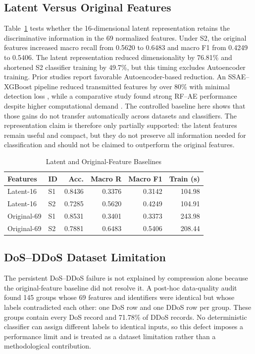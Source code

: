 \documentclass[conference]{IEEEtran}
\begin{document}
\subsection{Latent Versus Original Features}
Table~\ref{tab:representation_results} tests whether the 16-dimensional latent representation retains the discriminative information in the 69 normalized features. Under S2, the original features increased macro recall from 0.5620 to 0.6483 and macro F1 from 0.4249 to 0.5406. The latent representation reduced dimensionality by 76.81\% and shortened S2 classifier training by 49.7\%, but this timing excludes Autoencoder training. Prior studies report favorable Autoencoder-based reduction. An SSAE--XGBoost pipeline reduced transmitted features by over 80\% with minimal detection loss \cite{HariVinayak2025}, while a comparative study found strong RF--AE performance despite higher computational demand \cite{Li2024FeatureReduction}. The controlled baseline here shows that those gains do not transfer automatically across datasets and classifiers. The representation claim is therefore only partially supported: the latent features remain useful and compact, but they do not preserve all information needed for classification and should not be claimed to outperform the original features.

\begin{table}[t]
\caption{Latent and Original-Feature Baselines}
\label{tab:representation_results}
\centering
\scriptsize
\setlength{\tabcolsep}{2.2pt}
\renewcommand{\arraystretch}{0.96}
\begin{tabular}{@{}llrrrr@{}}
\toprule
\textbf{Features} & \textbf{ID} & \textbf{Acc.} & \textbf{Macro R} & \textbf{Macro F1} & \textbf{Train (s)} \\
\midrule
Latent-16   & S1 & 0.8436 & 0.3376 & 0.3142 & 104.98 \\
Latent-16   & S2 & 0.7285 & 0.5620 & 0.4249 & 104.91 \\
Original-69 & S1 & 0.8531 & 0.3401 & 0.3373 & 243.98 \\
Original-69 & S2 & 0.7881 & 0.6483 & 0.5406 & 208.44 \\
\bottomrule
\end{tabular}
\end{table}

\subsection{DoS--DDoS Dataset Limitation}
The persistent DoS--DDoS failure is not explained by compression alone because the original-feature baseline did not resolve it. A post-hoc data-quality audit found 145 groups whose 69 features and identifiers were identical but whose labels contradicted each other: one DoS row and one DDoS row per group. These groups contain every DoS record and 71.78\% of DDoS records. No deterministic classifier can assign different labels to identical inputs, so this defect imposes a performance limit and is treated as a dataset limitation rather than a methodological contribution.
\end{document}
